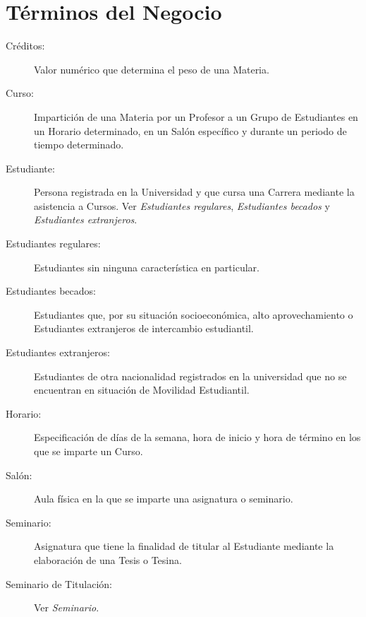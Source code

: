 \section{Términos del Negocio}

\begin{description}
	\item[Créditos:] Valor numérico que determina el peso de una Materia.
	\item[Curso:] Impartición de una Materia por un Profesor a un Grupo de Estudiantes en un Horario determinado, en un Salón específico y durante un periodo de tiempo determinado.
	\item[Estudiante:] Persona registrada en la Universidad y que cursa una Carrera mediante la asistencia a Cursos. Ver {\em Estudiantes regulares}, {\em Estudiantes becados} y {\em Estudiantes extranjeros}.
	\item[Estudiantes regulares:] Estudiantes sin ninguna característica en particular.
	\item[Estudiantes becados:] Estudiantes que, por su situación socioeconómica, alto aprovechamiento o Estudiantes extranjeros de intercambio estudiantil.
	\item[Estudiantes extranjeros:] Estudiantes de otra nacionalidad registrados en la universidad que no se encuentran en situación de Movilidad Estudiantil.
	\item[Horario:] Especificación de días de la semana, hora de inicio y hora de término en los que se imparte un Curso.
	\item[Salón:] Aula física en la que se imparte una asignatura o seminario.
	\item[Seminario:] Asignatura que tiene la finalidad de titular al Estudiante mediante la elaboración de una Tesis o Tesina.
	\item[Seminario de Titulación:] Ver {\em Seminario}.
\end{description}
